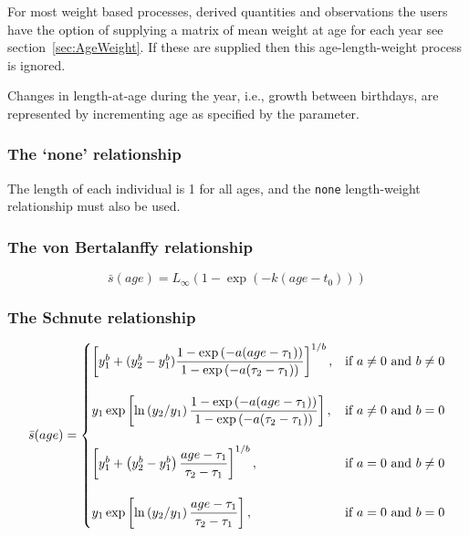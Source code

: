 For most weight based processes, derived quantities and observations the users have the option of supplying a matrix of mean weight at age for each year see section~\ref{sec:AgeWeight}. If these are supplied then this age-length-weight process is ignored.


Changes in length-at-age during the year, i.e., growth between birthdays, are represented by incrementing age as specified by the  parameter.
	
\subsubsection{The `none' relationship}\label{sec:AgeLength-None}

The length of each individual is 1 for all ages, and the \texttt{none} length-weight relationship must also be used.

\subsubsection{The von Bertalanffy relationship}\label{sec:AgeLength-VonBertalanffy}

\begin{equation}
\bar{s}(age)= L_\infty \left( 1 - \exp \left( -k \left(age-t_0 \right) \right) \right)
\end{equation}

\subsubsection{The Schnute relationship}\label{sec:AgeLength-Schnute}

\begin{equation}
\bar{s}(age)=\displaystyle\begin{cases}
  \left[ y_1^b + (y_2^b - y_1^b) \dfrac{1-\exp \left(-a(age - \tau_1) \right)}{1-\exp \left(-a(\tau_2 - \tau_1) \right)} \right]^{1/b}, & \text{if $a\ne0$ and $b\ne0$} \\
  \AddVspace
  y_1 \exp \left[ \ln \left( y_2 / y_1 \right) \dfrac{1-\exp \left(-a(age - \tau_1) \right)}{1-\exp \left(-a(\tau_2 - \tau_1) \right)} \right], & \text{if $a\ne0$ and $b=0$} \\
  \AddVspace
  \left[ y_1^b + \left( y_2^b - y_1^b \right) \dfrac{age-\tau_1}{\tau_2 - \tau_1} \right]^{1/b}, & \text{if $a=0$ and $b\ne0$} \\
  \AddVspace
  y_1 \exp \left[ \ln \left( y_2/y_1 \right) \dfrac{age-\tau_1}{\tau_2 - \tau_1} \right] , & \text{if $a=0$ and $b=0$} \\
  \end{cases}
\end{equation}

